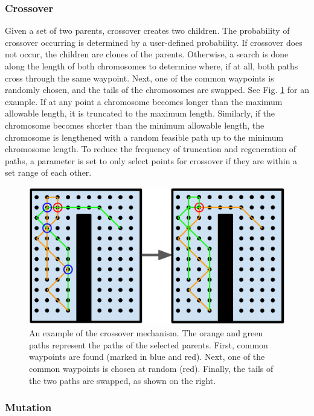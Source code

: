 \documentclass[letterpaper, 10 pt, conference]{ieeeconf}  %
\begin{document}
\subsubsection{Crossover}

Given a set of two parents, crossover creates two children. The probability of crossover occurring is determined by a user-defined probability. If crossover does not occur, the children are clones of the parents. Otherwise, a search is done along the length of both chromosomes to determine where, if at all, both paths cross through the same waypoint. Next, one of the common waypoints is randomly chosen, and the tails of the chromosomes are swapped. See Fig. \ref{fig:crossover} for an example. If at any point a chromosome becomes longer than the maximum allowable length, it is truncated to the maximum length. Similarly, if the chromosome becomes shorter than the minimum allowable length, the chromosome is lengthened with a random feasible path up to the minimum chromosome length. To reduce the frequency of truncation and regeneration of paths, a parameter is set to only select points for crossover if they are within a set range of each other.

\begin{figure}
\centering
\includegraphics[width=1.0\linewidth]{crossover.png}
\caption[An example of the coverage planner crossover mechanism.]{An example of the crossover mechanism. The orange and green paths represent the paths of the selected parents. First, common waypoints are found (marked in blue and red). Next, one of the common waypoints is chosen at random (red). Finally, the tails of the two paths are swapped, as shown on the right.}
\label{fig:crossover}
\end{figure}

\subsubsection{Mutation}
\end{document}
